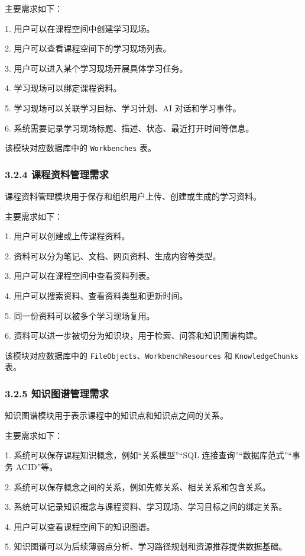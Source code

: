 \documentclass[10pt,a4paper,fontset=none]{ctexart}
\begin{document}
主要需求如下：\par

1. 用户可以在课程空间中创建学习现场。\par
2. 用户可以查看课程空间下的学习现场列表。\par
3. 用户可以进入某个学习现场开展具体学习任务。\par
4. 学习现场可以绑定课程资料。\par
5. 学习现场可以关联学习目标、学习计划、AI 对话和学习事件。\par
6. 系统需要记录学习现场标题、描述、状态、最近打开时间等信息。\par

该模块对应数据库中的 \texttt{Workbenches} 表。\par

\subsubsection*{3.2.4 课程资料管理需求}

课程资料管理模块用于保存和组织用户上传、创建或生成的学习资料。\par

主要需求如下：\par

1. 用户可以创建或上传课程资料。\par
2. 资料可以分为笔记、文档、网页资料、生成内容等类型。\par
3. 用户可以在课程空间中查看资料列表。\par
4. 用户可以搜索资料、查看资料类型和更新时间。\par
5. 同一份资料可以被多个学习现场复用。\par
6. 资料可以进一步被切分为知识块，用于检索、问答和知识图谱构建。\par

该模块对应数据库中的 \texttt{FileObjects}、\texttt{WorkbenchResources} 和 \texttt{KnowledgeChunks} 表。\par

\subsubsection*{3.2.5 知识图谱管理需求}

知识图谱模块用于表示课程中的知识点和知识点之间的关系。\par

主要需求如下：\par

1. 系统可以保存课程知识概念，例如“关系模型”“SQL 连接查询”“数据库范式”“事务 ACID”等。\par
2. 系统可以保存概念之间的关系，例如先修关系、相关关系和包含关系。\par
3. 系统可以记录知识概念与课程资料、学习现场、学习目标之间的绑定关系。\par
4. 用户可以查看课程空间下的知识图谱。\par
5. 知识图谱可以为后续薄弱点分析、学习路径规划和资源推荐提供数据基础。\par
\end{document}
